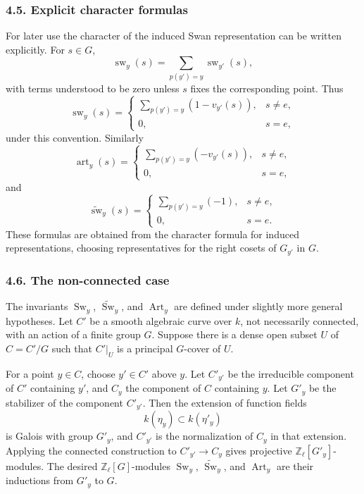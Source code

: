 \documentclass[11pt]{article}
\theoremstyle{plain}
\theoremstyle{definition}
\theoremstyle{remark}
\newcommand{\ZZ}{\mathbb Z}
\newcommand{\wt}[1]{\widetilde{#1}}
\providecommand{\Sw}{\operatorname{Sw}}
\providecommand{\Art}{\operatorname{Art}}
\begin{document}
\subsubsection*{4.5. Explicit character formulas}

For later use the character of the induced Swan representation can be written explicitly. For $s\in G$,
\[
   \operatorname{sw}_y(s)=
   \sum_{p(y')=y}\operatorname{sw}_{y'}(s),
\]
with terms understood to be zero unless $s$ fixes the corresponding point. Thus
\[
   \operatorname{sw}_y(s)=
   \begin{cases}
      \sum_{p(y')=y}(1-v_{y'}(s)), & s\ne e,\\
      0, & s=e,
   \end{cases}
\]
under this convention. Similarly
\[
   \operatorname{art}_y(s)=
   \begin{cases}
      \sum_{p(y')=y}(-v_{y'}(s)), & s\ne e,\\
      0, & s=e,
   \end{cases}
\]
and
\[
   \widetilde{\operatorname{sw}}_y(s)=
   \begin{cases}
      \sum_{p(y')=y}(-1), & s\ne e,\\
      0, & s=e.
   \end{cases}
\]
These formulas are obtained from the character formula for induced representations, choosing representatives for the right cosets of $G_{y'}$ in $G$.

\subsubsection*{4.6. The non-connected case}

The invariants $\Sw_y$, $\wt{\Sw}_y$, and $\Art_y$ are defined under slightly more general hypotheses. Let $C'$ be a smooth algebraic curve over $k$, not necessarily connected, with an action of a finite group $G$. Suppose there is a dense open subset $U$ of $C=C'/G$ such that $C'|_U$ is a principal $G$-cover of $U$.

For a point $y\in C$, choose $y'\in C'$ above $y$. Let $C'_{y'}$ be the irreducible component of $C'$ containing $y'$, and $C_y$ the component of $C$ containing $y$. Let $G'_{y}$ be the stabilizer of the component $C'_{y'}$. Then the extension of function fields
\[
   k(\eta_y)\subset k(\eta'_{y})
\]
is Galois with group $G'_y$, and $C'_{y'}$ is the normalization of $C_y$ in that extension. Applying the connected construction to $C'_{y'}\to C_y$ gives projective $\ZZ_\ell[G'_y]$-modules. The desired $\ZZ_\ell[G]$-modules $\Sw_y$, $\wt{\Sw}_y$, and $\Art_y$ are their inductions from $G'_y$ to $G$.
\end{document}
